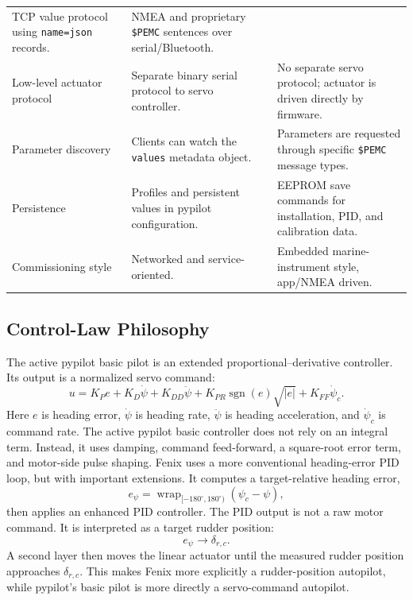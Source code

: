 \documentclass[10pt,twocolumn]{article}
\newcommand{\abs}[1]{\left\lvert #1 \right\rvert}
\begin{document}
\begin{table}[!tbp]
\begin{tabularx}{\textwidth}{Z{0.18\textwidth}YY}
TCP value protocol using \texttt{name=json} records. &
NMEA and proprietary \texttt{\$PEMC} sentences over serial/Bluetooth. \\
Low-level actuator protocol &
Separate binary serial protocol to servo controller. &
No separate servo protocol; actuator is driven directly by firmware. \\
Parameter discovery &
Clients can watch the \texttt{values} metadata object. &
Parameters are requested through specific \texttt{\$PEMC} message types. \\
Persistence &
Profiles and persistent values in pypilot configuration. &
EEPROM save commands for installation, PID, and calibration data. \\
Commissioning style &
Networked and service-oriented. &
Embedded marine-instrument style, app/NMEA driven. \\
\bottomrule
\end{tabularx}
\endgroup
\end{table}
\subsection{Control-Law Philosophy}
The active pypilot basic pilot is an extended proportional--derivative
controller.  Its output is a normalized servo command:
\[
u
=
K_P e
+
K_D \dot{\psi}
+
K_{DD}\ddot{\psi}
+
K_{PR}\operatorname{sgn}(e)\sqrt{\abs{e}}
+
K_{FF}\dot{\psi}_c .
\]
Here \(e\) is heading error, \(\dot{\psi}\) is heading rate,
\(\ddot{\psi}\) is heading acceleration, and \(\dot{\psi}_c\) is command
rate.  The active pypilot basic controller does not rely on an integral
term.  Instead, it uses damping, command feed-forward, a square-root error
term, and motor-side pulse shaping.
Fenix uses a more conventional heading-error PID loop, but with important
extensions.  It computes a target-relative heading error,
\[
e_\psi
=
\operatorname{wrap}_{[-180^\circ,180^\circ)}
\left(
\psi_c-\psi
\right),
\]
then applies an enhanced PID controller.  The PID output is not a raw
motor command.  It is interpreted as a target rudder position:
\[
e_\psi
\longrightarrow
\delta_{r,c}.
\]
A second layer then moves the linear actuator until the measured rudder
position approaches \(\delta_{r,c}\).  This makes Fenix more explicitly a
rudder-position autopilot, while pypilot's basic pilot is more directly a
servo-command autopilot.
\end{document}
